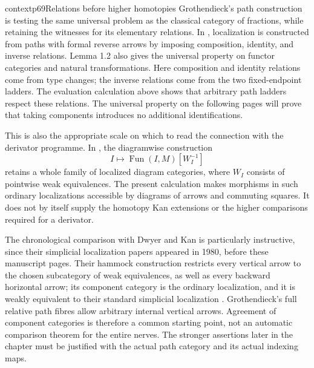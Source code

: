 \begin{dcomment}{context}{p69}{Relations before higher homotopies}
Grothendieck's path construction is testing the same universal problem as the classical category of fractions, while retaining the witnesses for its elementary relations. In \citet[Chapter I, \S1.1 and Lemma 1.2]{GabrielZisman1967}, localization is constructed from paths with formal reverse arrows by imposing composition, identity, and inverse relations. Lemma 1.2 also gives the universal property on functor categories and natural transformations. Here composition and identity relations come from type changes; the inverse relations come from the two fixed-endpoint ladders. The evaluation calculation above shows that arbitrary path ladders respect these relations. The universal property on the following pages will prove that taking components introduces no additional identifications.

This is also the appropriate scale on which to read the connection with the derivator programme. In \citet[\S69, pp.~1--4 of the separately edited text]{Grothendieck1983}, the diagramwise construction
\[
 I\longmapsto
 \operatorname{Fun}(I,M)[W_I^{-1}]
\]
retains a whole family of localized diagram categories, where $W_I$ consists of pointwise weak equivalences. The present calculation makes morphisms in such ordinary localizations accessible by diagrams of arrows and commuting squares. It does not by itself supply the homotopy Kan extensions or the higher comparisons required for a derivator.

The chronological comparison with Dwyer and Kan is particularly instructive, since their simplicial localization papers appeared in 1980, before these manuscript pages. Their hammock construction restricts every vertical arrow to the chosen subcategory of weak equivalences, as well as every backward horizontal arrow; its component category is the ordinary localization, and it is weakly equivalent to their standard simplicial localization \citep[Definition 2.1 and Propositions 2.2, 3.1]{DwyerKan1980Calculating}. Grothendieck's full relative path fibres allow arbitrary internal vertical arrows. Agreement of component categories is therefore a common starting point, not an automatic comparison theorem for the entire nerves. The stronger assertions later in the chapter must be justified with the actual path category and its actual indexing maps.
\end{dcomment}

